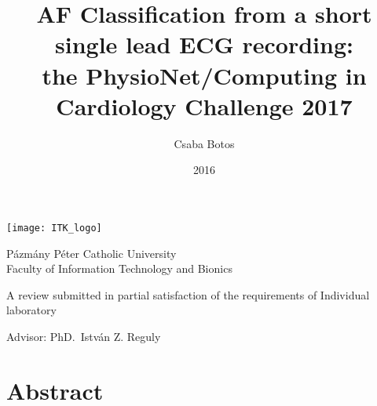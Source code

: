 \documentclass[11pt]{report}
\author{Csaba Botos}
\title{
AF Classification from a short single lead ECG recording:\\
the PhysioNet/Computing in Cardiology Challenge 2017
}
\date{2016}
\begin{document}

\texttt{[image: ITK\_logo]} \parbox[c]{0.8\textwidth}{
Pázmány Péter Catholic University\\
Faculty of Information Technology and Bionics}
\vspace*{\fill}

{\let\newpage\relax\maketitle}
\vspace*{\fill}
\begin{center}
A review submitted in partial satisfaction of the requirements of Individual
laboratory
\bigskip

Advisor: PhD.\ István Z. Reguly \\
\end{center}
\clearpage


\section{Abstract}







\clearpage


\clearpage


\clearpage

\listoffigures
{}
\clearpage

\printbibliography
{}
\clearpage
\end{document}

